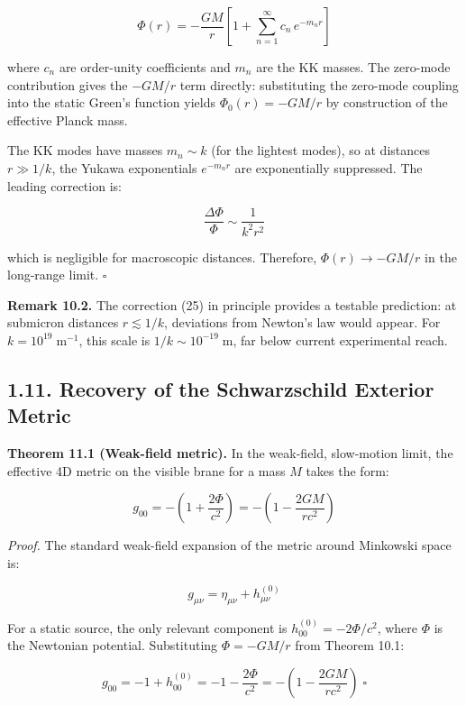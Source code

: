 \documentclass[
  11pt,
]{article}
\begin{document}
\[\Phi(r) = -\frac{GM}{r}\left[1 + \sum_{n=1}^{\infty} c_n\,e^{-m_n r}\right] \tag{35}\]

where \(c_n\) are order-unity coefficients and \(m_n\) are the KK
masses. The zero-mode contribution gives the \(-GM/r\) term directly:
substituting the zero-mode coupling into the static Green's function
yields \(\Phi_0(r) = -GM/r\) by construction of the effective Planck
mass.

The KK modes have masses \(m_n \sim k\) (for the lightest modes), so at
distances \(r \gg 1/k\), the Yukawa exponentials \(e^{-m_n r}\) are
exponentially suppressed. The leading correction is:

\[\frac{\Delta\Phi}{\Phi} \sim \frac{1}{k^2 r^2} \tag{36}\]

which is negligible for macroscopic distances. Therefore,
\(\Phi(r) \to -GM/r\) in the long-range limit. \(\square\)

\textbf{Remark 10.2.} The correction (25) in principle provides a
testable prediction: at submicron distances \(r \lesssim 1/k\),
deviations from Newton's law would appear. For
\(k = 10^{19}\;\text{m}^{-1}\), this scale is
\(1/k \sim 10^{-19}\;\text{m}\), far below current experimental reach.

\bigskip

\hypertarget{recovery-of-the-schwarzschild-exterior-metric}{%
\subsection{1.11. Recovery of the Schwarzschild Exterior
Metric}\label{recovery-of-the-schwarzschild-exterior-metric}}

\textbf{Theorem 11.1 (Weak-field metric).} In the weak-field,
slow-motion limit, the effective 4D metric on the visible brane for a
mass \(M\) takes the form:

\[g_{00} = -\left(1 + \frac{2\Phi}{c^2}\right) = -\left(1 - \frac{2GM}{rc^2}\right) \tag{37}\]

\emph{Proof.} The standard weak-field expansion of the metric around
Minkowski space is:

\[g_{\mu\nu} = \eta_{\mu\nu} + h_{\mu\nu}^{(0)} \tag{38}\]

For a static source, the only relevant component is
\(h_{00}^{(0)} = -2\Phi/c^2\), where \(\Phi\) is the Newtonian
potential. Substituting \(\Phi = -GM/r\) from Theorem 10.1:

\[g_{00} = -1 + h_{00}^{(0)} = -1 - \frac{2\Phi}{c^2} = -\left(1 - \frac{2GM}{rc^2}\right) \;\square \tag{39}\]
\end{document}
